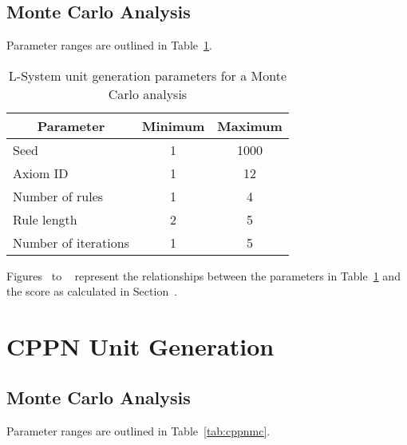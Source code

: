 \subsection{Monte Carlo Analysis}

Parameter ranges are outlined in Table~\ref{tab:lsmc}.

\begin{table}[H]
\centering
\caption{L-System unit generation parameters for a Monte Carlo analysis}
\label{tab:lsmc}
\begin{tabular}{@{}lcc@{}}
\toprule
\multicolumn{1}{c}{\textbf{Parameter}} & \textbf{Minimum} & \textbf{Maximum} \\ \midrule
Seed                                   & 1                & 1000             \\
Axiom ID                               & 1                & 12               \\
Number of rules                        & 1                & 4                \\
Rule length                            & 2                & 5                \\
Number of iterations                   & 1                & 5                \\ \bottomrule
\end{tabular}
\end{table}

Figures~ to ~ represent the relationships between the parameters in Table~\ref{tab:lsmc} and the score as calculated in Section~.

\section{CPPN Unit Generation}

\subsection{Monte Carlo Analysis}

Parameter ranges are outlined in Table~\ref{tab:cppnmc}.

